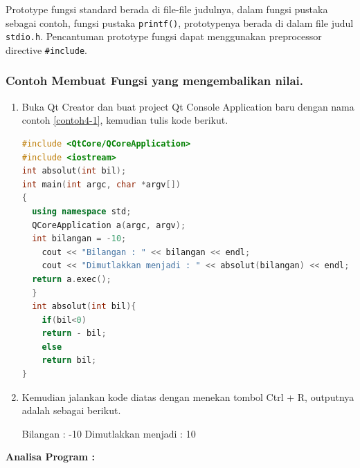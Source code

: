 Prototype fungsi standard berada di file-file judulnya, dalam fungsi
pustaka sebagai contoh, fungsi pustaka \texttt{printf()}, prototypenya
berada di dalam file judul \texttt{stdio.h}. Pencantuman prototype
fungsi dapat menggunakan preprocessor directive \texttt{\#include}.

\subsubsection*{Contoh  Membuat Fungsi yang mengembalikan nilai.}

\begin{enumerate}

\item
  Buka Qt Creator dan buat project Qt Console Application baru dengan
  nama contoh \ref{contoh4-1}, kemudian tulis kode berikut.

\begin{lstlisting}[language=c++, caption=Membuat Fungsi yang mengembalikan nilai, label=contoh4-1]
#include <QtCore/QCoreApplication>
#include <iostream>
int absolut(int bil);
int main(int argc, char *argv[])
{
  using namespace std;
  QCoreApplication a(argc, argv);
  int bilangan = -10;
    cout << "Bilangan : " << bilangan << endl;
    cout << "Dimutlakkan menjadi : " << absolut(bilangan) << endl;
  return a.exec();
  }
  int absolut(int bil){
    if(bil<0)
    return - bil;
    else
    return bil;
}
\end{lstlisting}
\item
  Kemudian jalankan kode diatas dengan menekan tombol Ctrl + R, outputnya
  adalah sebagai berikut.
  \begin{lcverbatim}
  	Bilangan : -10
  	Dimutlakkan menjadi : 10
  \end{lcverbatim}
\end{enumerate}



\textbf{Analisa Program :}

